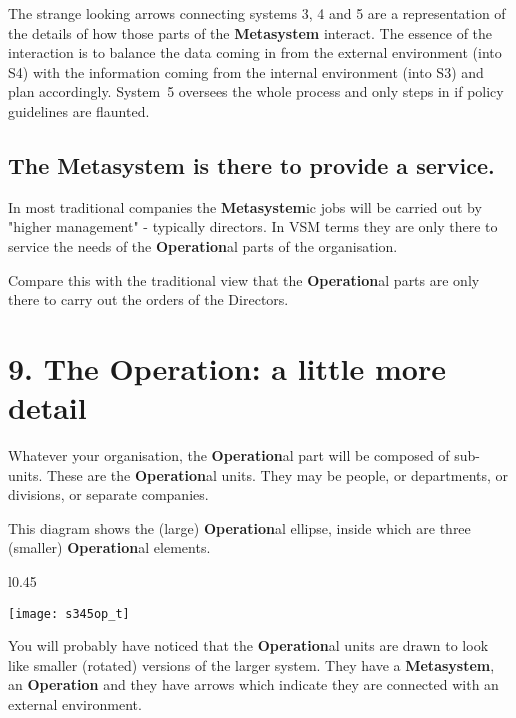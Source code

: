 The strange looking arrows connecting systems 3, 4 and 5 are a representation of the details of how those parts of the \textcolor{M}{\textbf{Metasystem}} interact. The essence of the interaction is to balance the data coming in from the external environment (into S4) with the information coming from the internal environment (into S3) and plan accordingly. System 5 oversees the whole process and only steps in if policy guidelines are flaunted.

\subsection*{The \textcolor{M}{\textbf{Metasystem}} is there to provide a service.}
In most traditional companies the \textcolor{M}{\textbf{Metasystem}}ic jobs will be carried out by "higher management" - typically directors. In VSM terms they are only there to service the needs of the \textcolor{O}{\textbf{Operation}}al parts of the organisation.

Compare this with the traditional view that the \textcolor{O}{\textbf{Operation}}al parts are only there to carry out the orders of the Directors.

\pagebreak
\section*{9. The \textcolor{O}{\textbf{Operation}}: a little more detail}
Whatever your organisation, the \textcolor{O}{\textbf{Operation}}al part will be composed of sub-units. These are the \textcolor{O}{\textbf{Operation}}al units. They may be people, or departments, or divisions, or separate companies.

This diagram shows the (large) \textcolor{O}{\textbf{Operation}}al ellipse, inside which are three (smaller) \textcolor{O}{\textbf{Operation}}al elements.

\begin{wrapfigure}[11]{l}{0.45\textwidth}
    \begin{center}
        \texttt{[image: s345op\_t]}
    \end{center}
\end{wrapfigure}

You will probably have noticed that the \textcolor{O}{\textbf{Operation}}al units are drawn to look like smaller (rotated) versions of the larger system. They have a \textcolor{M}{\textbf{Metasystem}}, an \textcolor{O}{\textbf{Operation}} and they have arrows which indicate they are connected with an external environment.


